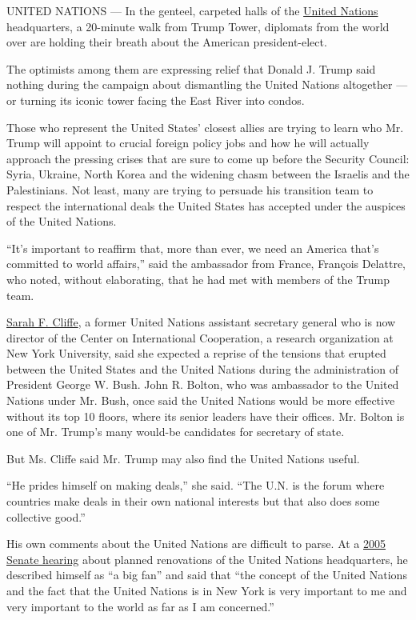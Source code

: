 UNITED NATIONS --- In the genteel, carpeted halls of the
\href{http://www.nytimes.com/topic/organization/united-nations?inline=nyt-org}{United
Nations} headquarters, a 20-minute walk from Trump Tower, diplomats from
the world over are holding their breath about the American
president-elect.

The optimists among them are expressing relief that Donald J. Trump said
nothing during the campaign about dismantling the United Nations
altogether --- or turning its iconic tower facing the East River into
condos.

Those who represent the United States' closest allies are trying to
learn who Mr. Trump will appoint to crucial foreign policy jobs and how
he will actually approach the pressing crises that are sure to come up
before the Security Council: Syria, Ukraine, North Korea and the
widening chasm between the Israelis and the Palestinians. Not least,
many are trying to persuade his transition team to respect the
international deals the United States has accepted under the auspices of
the United Nations.

``It's important to reaffirm that, more than ever, we need an America
that's committed to world affairs,'' said the ambassador from France,
François Delattre, who noted, without elaborating, that he had met with
members of the Trump team.

\href{http://cic.nyu.edu/people/sarah-cliffe}{Sarah F. Cliffe}, a former
United Nations assistant secretary general who is now director of the
Center on International Cooperation, a research organization at New York
University, said she expected a reprise of the tensions that erupted
between the United States and the United Nations during the
administration of President George W. Bush. John R. Bolton, who was
ambassador to the United Nations under Mr. Bush, once said the United
Nations would be more effective without its top 10 floors, where its
senior leaders have their offices. Mr. Bolton is one of Mr. Trump's many
would-be candidates for secretary of state.

But Ms. Cliffe said Mr. Trump may also find the United Nations useful.

``He prides himself on making deals,'' she said. ``The U.N. is the forum
where countries make deals in their own national interests but that also
does some collective good.''

His own comments about the United Nations are difficult to parse. At a
\href{https://www.gpo.gov/fdsys/pkg/CHRG-109shrg23164/html/CHRG-109shrg23164.htm}{2005
Senate hearing} about planned renovations of the United Nations
headquarters, he described himself as ``a big fan'' and said that ``the
concept of the United Nations and the fact that the United Nations is in
New York is very important to me and very important to the world as far
as I am concerned.''


